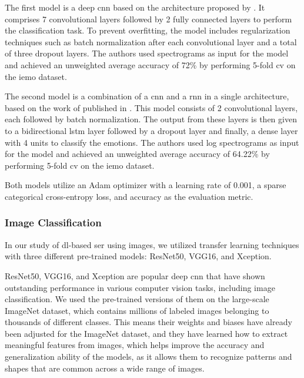 The first model is a deep \ac{cnn} based on the architecture proposed by \citeauthor{Mustaqeem2019} \cite{Mustaqeem2019}. It comprises 7 convolutional layers followed by 2 fully connected layers to perform the classification task. To prevent overfitting, the model includes regularization techniques such as batch normalization after each convolutional layer and a total of three dropout layers. The authors used spectrograms as input for the model and achieved an unweighted average accuracy of 72\% by performing 5-fold \ac{cv} on the \ac{iemo} dataset.

The second model is a combination of a \ac{cnn} and a \ac{rnn} in a single architecture, based on the work of \citeauthor{ma18b_interspeech} \cite{ma18b_interspeech} published in \citeyear{ma18b_interspeech}. This model consists of 2 convolutional layers, each followed by batch normalization. The output from these layers is then given to a bidirectional \ac{lstm} layer followed by a dropout layer and finally, a dense layer with 4 units to classify the emotions. The authors used log spectrograms as input for the model and achieved an unweighted average accuracy of 64.22\% by performing 5-fold \ac{cv} on the \ac{iemo} dataset.

Both models utilize an Adam optimizer with a learning rate of 0.001, a sparse categorical cross-entropy loss, and accuracy as the evaluation metric.

\subsubsection{Image Classification}

In our study of \ac{dl}-based \ac{ser} using images, we utilized transfer learning techniques with three different pre-trained models: ResNet50, VGG16, and Xception.

ResNet50, VGG16, and Xception are popular deep \ac{cnn} that have shown outstanding performance in various computer vision tasks, including image classification. We used the pre-trained versions of them on the large-scale ImageNet dataset, which contains millions of labeled images belonging to thousands of different classes. This means their weights and biases have already been adjusted for the ImageNet dataset, and they have learned how to extract meaningful features from images, which helps improve the accuracy and generalization ability of the models, as it allows them to recognize patterns and shapes that are common across a wide range of images.

